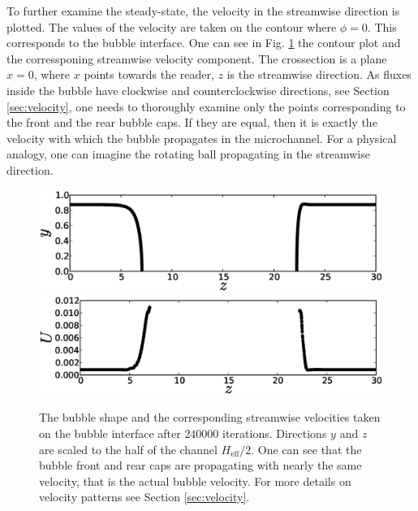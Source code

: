 \documentclass[preprint,12pt]{elsarticle}
\begin{document}
To further examine the steady-state, the velocity in the streamwise direction is plotted. The values
of the velocity are taken on the contour where $\phi=0$. This corresponds
 to the bubble interface. One can see in Fig. \ref{fig:velocity:contour} the contour plot and the
corressponing streamwise velocity
component. The crossection is a plane $x=0$, where $x$ points
towards the reader, $z$ is the streamwise direction. As fluxes inside the bubble have
clockwise and counterclockwise directions, see Section \ref{sec:velocity}, one needs to thoroughly
examine only the points corresponding to the front and the rear bubble caps. If they are equal, then
it is exactly the velocity with which the bubble propagates in the microchannel.
For a physical analogy, one can imagine the rotating ball propagating in the streamwise direction. 
\begin{figure}[ht]
\includegraphics[width=\textwidth]{Figures/velocity_interface_contour.eps}\\
\includegraphics[width=\textwidth]{Figures/velocity_interface_values.eps}\\
\caption{The bubble shape and the corresponding streamwise velocities taken on the bubble
interface after $240000$ iterations. Directions $y$ and $z$ are scaled to the half of the channel
$H_{\mathrm{eff}}/2$. One can see that the bubble front and rear caps are propagating with nearly
the
same velocity, that is the actual bubble velocity. For more details on velocity patterns
see Section \ref{sec:velocity}. \label{fig:velocity:contour}}
\end{figure}
\end{document}
